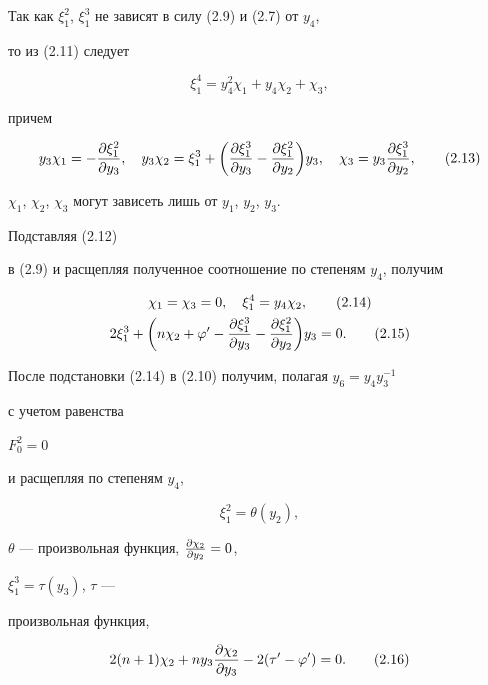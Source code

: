 Так как $\xi^2_1$, $\xi^3_1$ не зависят в силу (2.9) и (2.7) от $y_4$,


то из (2.11) следует


\begin{equation}


\xi^4_1=y^2_4\chi_1+y_4\chi_2+\chi_3,\tag{2.12}


\end{equation}


причем


\begin{equation}


y_3\chi_1=-\frac{\dk^2_1}{\dy_3},\quad y_3\chi_2=\xi^3_1+\biggl(


\frac{\dk^3_1}{\dy_3}-\frac{\dk^2_1}{\dy_2}\biggr)y_3,\quad


\chi_3=y_3\frac{\dk^3_1}{\dy_2},\tag{2.13}


\end{equation}


$\chi_1$, $\chi_2$, $\chi_3$ могут зависеть лишь от $y_1$, $y_2$, $y_3$.


Подставляя (2.12)


в (2.9) и расщепляя полученное соотношение по степеням $y_4$, получим


\begin{gather}


\chi_1=\chi_3=0,\quad \xi^4_1=y_4\chi_2,\tag{2.14}\\


2\xi^3_1+\biggl(n\chi_2+\varphi'-\frac{\dk^3_1}{\dy_3}-


\frac{\dk^2_1}{\dy_2}\biggr)y_3=0.\tag{2.15}


\end{gather}


После подстановки (2.14) в (2.10) получим, полагая $y_6=y_4y^{-1}_3$ 


с учетом равенства


$F^2_0=0$


и расщепляя по степеням $y_4$,


$$


\xi^2_1=\theta(y_2),


$$


$\theta$ --- произвольная функция, $\frac{\partial\chi_2}{\partial y_2}=0$,


$\xi^3_1=\tau(y_3)$, $\tau$ ---


произвольная функция,


\begin{equation}


2(n+1)\chi_2+ny_3\frac{\pa\chi_2}{\dy_3}-2(\tau'-\varphi')=0.\tag{2.16}


\end{equation}


